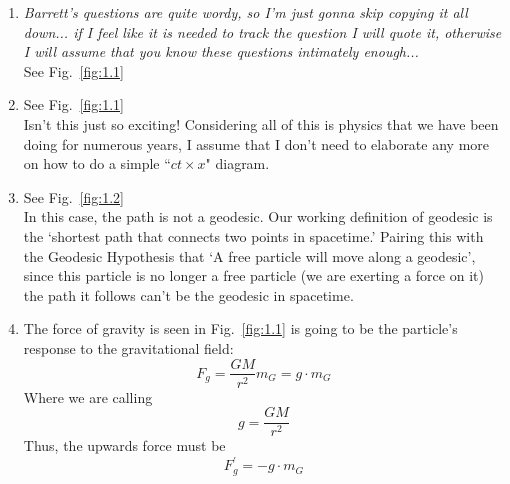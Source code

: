 \documentclass[12pt]{article}
\begin{document}
\begin{enumerate}[label=\alph*)]
\item {\sl Barrett's questions are quite wordy, so I'm just gonna skip copying it all down... if I feel like it is needed to track the question I will quote it, otherwise I will assume that you know these questions intimately enough...}\\

See Fig.~\ref{fig:1.1}

\item See Fig.~\ref{fig:1.1} \\
Isn't this just so exciting! Considering all of this is physics that we have been doing for numerous years, I assume that I don't need to elaborate any more on how to do a simple ``$ct \times x$" diagram. 

\item See Fig.~\ref{fig:1.2} \\ In this case, the path is not a geodesic. Our working definition of geodesic is the `shortest path that connects two points in spacetime.' Pairing this with the Geodesic Hypothesis that `A free particle will move along a geodesic', since this particle is no longer a free particle (we are exerting a force on it) the path it follows can't be the geodesic in spacetime.

\item The force of gravity is seen in Fig.~\ref{fig:1.1} is going to be the particle's response to the gravitational field:
\[F_g = \frac{GM}{r^2}m_G = g \cdot m_G\]
Where we are calling 
\[g = \frac{GM}{r^2}\]
Thus, the upwards force must be
\begin{equation}
F_g^\prime = - g \cdot m_G
\label{eq:1}
\end{equation}



\end{enumerate}
\end{document}
